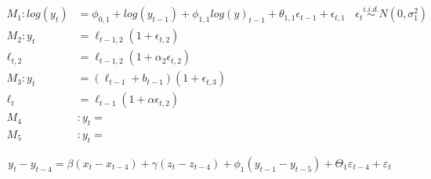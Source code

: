\documentclass{monashthesis}
\begin{document}
\[\begin{aligned}
M_1: log(y_t) &= \phi_{0,1} + log(y_{t-1}) + \phi_{1,1}log(y)_{t-1} + \theta_{1,1}\epsilon_{t-1} + \epsilon_{t,1} \ \ \ \ \epsilon_t \stackrel{i.i.d.}{\sim} N(0,\sigma_1^2) \\
M_2: y_t &= \ell_{t-1,2}(1+\epsilon_{t,2}) \\
  \ell_{t,2} &= \ell_{t-1,2}(1+\alpha_2\epsilon_{t,2}) \\
M_3: y_t &= (\ell_{t-1}+b_{t-1}) (1+\epsilon_{t,3}) \\
  \ell_t &= \ell_{t-1}(1+\alpha\epsilon_{t,2}) \\
M_4&: y_t = \\
M_5&: y_t = 
\end{aligned}\]

\begin{equation}
  y_t - y_{t-4} = \beta (x_t-x_{t-4}) + \gamma (z_t-z_{t-4}) + \phi_1 (y_{t-1} - y_{t-5}) + \Theta_1 \varepsilon_{t-4} + \varepsilon_t
\end{equation}

\textcite{fpp3}

\printbibliography[title={Reference}]
\end{document}
